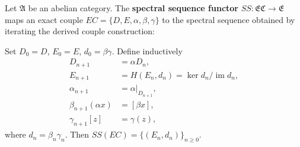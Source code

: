 Let $\mathfrak{A}$ be an abelian category. The \textbf{spectral sequence functor} $SS: \mathfrak{EC} \to \mathfrak{E}$ maps an exact couple $EC = \{D, E, \alpha, \beta, \gamma\}$ to the spectral sequence obtained by iterating the derived couple construction:

Set $D_0 = D$, $E_0 = E$, $d_0 = \beta\gamma$. Define inductively
\begin{align*}
D_{n+1} &= \alpha D_n, \\
E_{n+1} &= H(E_n, d_n) = \ker d_n / \operatorname{im} d_n, \\
\alpha_{n+1} &= \alpha|_{D_{n+1}}, \\
\beta_{n+1}(\alpha x) &= [\beta x], \\
\gamma_{n+1}[z] &= \gamma(z),
\end{align*}
where $d_n = \beta_n\gamma_n$. Then $SS(EC) = \{(E_n, d_n)\}_{n \geq 0}$.
